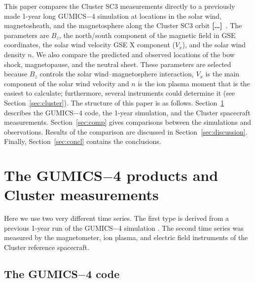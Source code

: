 \documentclass[linenumbers,draft]{agujournal}
\newcommand{\del}{\textbf{[\dots]}\ } %
\begin{document}
This paper compares the Cluster SC3 measurements directly to a previously made 1-year long GUMICS$-$4 simulation at locations in the solar wind, magnetosheath, and the magnetosphere along the Cluster SC3 orbit \del\citep{facsko16:_one_earth}. The parameters are $B_z$, the north/south component of the magnetic field in GSE coordinates, the solar wind velocity GSE X component ($V_x$), and the solar wind density $n$. We also compare the predicted and observed locations of the bow shock, magnetopause, and the neutral sheet. These parameters are selected because $B_z$ controls the solar wind--magnetosphere interaction, $V_x$ is the main component of the solar wind velocity and $n$ is the ion plasma moment that is the easiest to calculate; furthermore, several instruments could determine it (see Section~\ref{sec:cluster}). The structure of this paper is as follows. Section~\ref{sec:data} describes the GUMICS$-$4 code, the 1-year simulation, and the Cluster spacecraft measurements. Section~\ref{sec:comp} gives comparisons between the simulations and observations. Results of the comparison are discussed in Section~\ref{sec:discussion}. Finally, Section~\ref{sec:concl} contains the conclusions.

\section{The GUMICS$-$4 products and Cluster measurements}
\label{sec:data}

Here we use two very different time series. The first type is derived from a previous 1-year run of the GUMICS$-$4 simulation \citep{facsko16:_one_earth}. The second time series was measured by the magnetometer, ion plasma, and electric field instruments of the Cluster reference spacecraft.

\subsection{The GUMICS$-$4 code}
\label{sec:gumics}
\end{document}
